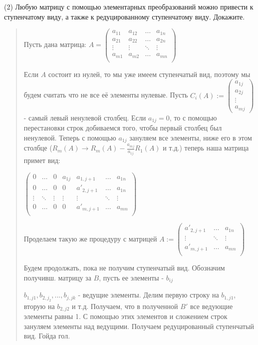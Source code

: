 \documentclass{article}
\begin{document}
(2) Любую матрицу с помощью элементарных преобразований можно привести к ступенчатому виду, а также к редуцированному ступенчатому виду. Докажите. 
\begin{quote}
    Пусть дана матрица: $A = 
    \begin{pmatrix} 
    a_{11} & a_{12} & \dots & a_{1n} \\
    a_{21} & a_{22} & \dots & a_{2n} \\ 
    \vdots & \vdots & \ddots & \vdots \\
    a_{m1} & a_{m2} & \dots & a_{mn} \\ 
    \end{pmatrix}$

    Если $A$ состоит из нулей, то мы уже имеем ступенчатый вид, поэтому мы будем считать что не все её элементы нулевые. Пусть $C_i(A) := \begin{pmatrix}
        a_{1j} \\ a_{2j} \\ \vdots \\ a_{mj}
    \end{pmatrix}$ - самый левый ненулевой столбец. Если $a_{1j} = 0$, то с помощью перестановки строк добиваемся того, чтобы первый столбец был ненулевой. Теперь с помощью $a_{1j}$ зануляем все элементы, ниже его в этом столбце ($R_m(A) \rightarrow R_m(A) - \frac{a_{mj}}{a_{1j}}R_1(A)$ и т.д.) теперь наша матрица примет вид:

    $\begin{pmatrix}
    0 & \dots & 0 & a_{1j}     & a_{1, j+1} & \dots & a_{1n} \\ 
    0 & \dots & 0 & 0     & a'_{2, j+1} & \dots & a_{1n} \\ 
    \vdots & \ddots & \vdots & \vdots     & \vdots & \ddots & \vdots \\ 
    0 & \dots & 0 & 0     & a'_{m, j+1} & \dots & a_{mn} \\ 
    \end{pmatrix}$

    Проделаем такую же процедуру с матрицей $A := \begin{pmatrix}
        a'_{2, j+1} & \dots & a_{1n} \\ 
        \vdots     &  \ddots & \vdots \\
        a'_{m, j+1} & \dots & a_{mn} \\ 
    \end{pmatrix}$

    Будем продолжать, пока не получим ступенчатый вид. Обозначим получивш. матрицу за $B$, пусть ее элементы - $b_{ij}$

    $b_{1, j1}, b_{2, j_2}, ... , b_{j, jk}$ - ведущие элементы. Делим первую строку на $b_{1, j1}$, вторую на $b_{2, j2}$ и т.д. Получаем, что в полученной $B'$ все ведующие элементы равны 1. С помощью этих элементов и сложением строк зануляем элементы над ведущими. Получаем редуцированный ступенчатый вид. Гойда гол.
    
\end{quote}
\end{document}
